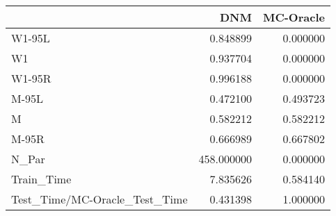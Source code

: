 \begin{tabular}{lrr}
\toprule
{} &         DNM &  MC-Oracle \\
\midrule
W1-95L                        &    0.848899 &   0.000000 \\
W1                            &    0.937704 &   0.000000 \\
W1-95R                        &    0.996188 &   0.000000 \\
M-95L                         &    0.472100 &   0.493723 \\
M                             &    0.582212 &   0.582212 \\
M-95R                         &    0.666989 &   0.667802 \\
N\_Par                         &  458.000000 &   0.000000 \\
Train\_Time                    &    7.835626 &   0.584140 \\
Test\_Time/MC-Oracle\_Test\_Time &    0.431398 &   1.000000 \\
\bottomrule
\end{tabular}
